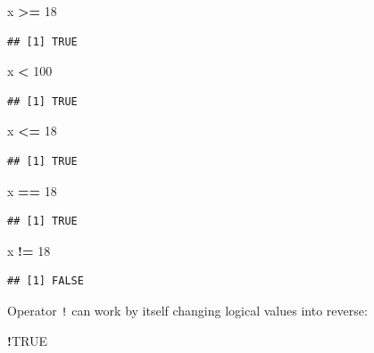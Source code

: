 \documentclass[
]{book}
\newenvironment{Shaded}{\begin{snugshade}}{\end{snugshade}}
\newcommand{\DecValTok}[1]{\textcolor[rgb]{0.00,0.00,0.81}{#1}}
\newcommand{\NormalTok}[1]{#1}
\newcommand{\OperatorTok}[1]{\textcolor[rgb]{0.81,0.36,0.00}{\textbf{#1}}}
\newcommand{\OtherTok}[1]{\textcolor[rgb]{0.56,0.35,0.01}{#1}}
\newcommand{\StringTok}[1]{\textcolor[rgb]{0.31,0.60,0.02}{#1}}
\begin{document}
\begin{Shaded}
\begin{Highlighting}[]
\NormalTok{x }\OperatorTok{>=}\StringTok{ }\DecValTok{18}
\end{Highlighting}
\end{Shaded}

\begin{verbatim}
## [1] TRUE
\end{verbatim}

\begin{Shaded}
\begin{Highlighting}[]
\NormalTok{x }\OperatorTok{<}\StringTok{ }\DecValTok{100}
\end{Highlighting}
\end{Shaded}

\begin{verbatim}
## [1] TRUE
\end{verbatim}

\begin{Shaded}
\begin{Highlighting}[]
\NormalTok{x }\OperatorTok{<=}\StringTok{ }\DecValTok{18}
\end{Highlighting}
\end{Shaded}

\begin{verbatim}
## [1] TRUE
\end{verbatim}

\begin{Shaded}
\begin{Highlighting}[]
\NormalTok{x }\OperatorTok{==}\StringTok{ }\DecValTok{18}
\end{Highlighting}
\end{Shaded}

\begin{verbatim}
## [1] TRUE
\end{verbatim}

\begin{Shaded}
\begin{Highlighting}[]
\NormalTok{x }\OperatorTok{!=}\StringTok{ }\DecValTok{18}
\end{Highlighting}
\end{Shaded}

\begin{verbatim}
## [1] FALSE
\end{verbatim}

Operator \texttt{!} can work by itself changing logical values into reverse:

\begin{Shaded}
\begin{Highlighting}[]
\OperatorTok{!}\OtherTok{TRUE}
\end{Highlighting}
\end{Shaded}
\end{document}

